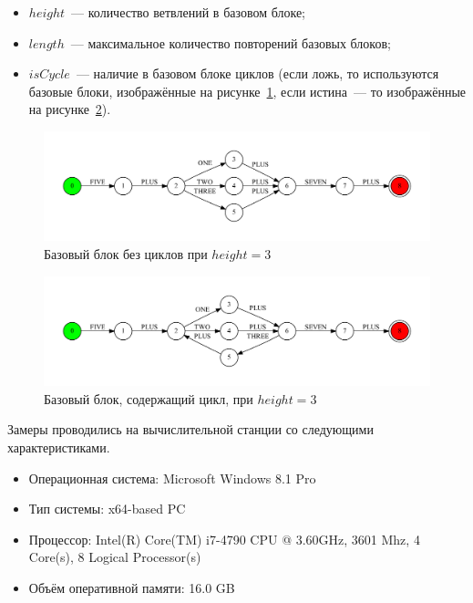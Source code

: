 \begin{itemize}
  \item $height$~--- количество ветвлений в базовом блоке;
  \item $length$~--- максимальное количество повторений базовых блоков;
  \item $isCycle$~--- наличие в базовом блоке циклов (если ложь, то используются базовые блоки, изображённые на рисунке~\ref{block}, если истина~--- то изображённые на рисунке~\ref{block_loop}).
\end{itemize}

\begin{figure}[h!]
 \centering
 \includegraphics[width=15cm]{pics/block.pdf}
 \caption{Базовый блок без циклов при $height=3$}
 \label{block}
\end{figure}

\begin{figure}[h!]
 \centering
 \includegraphics[width=15cm]{pics/block_loop.pdf}
 \caption{Базовый блок, содержащий цикл, при $height=3$}
 \label{block_loop}
\end{figure}

Замеры проводились на вычислительной станции со следующими характеристиками.
\begin{itemize}
\item Операционная система: Microsoft Windows 8.1 Pro
\item Тип системы: x64-based PC
\item Процессор: Intel(R) Core(TM) i7-4790 CPU @ 3.60GHz, 3601 Mhz, 4 Core(s), 8 Logical Processor(s)
\item Объём оперативной памяти: 16.0 GB
\end{itemize}

